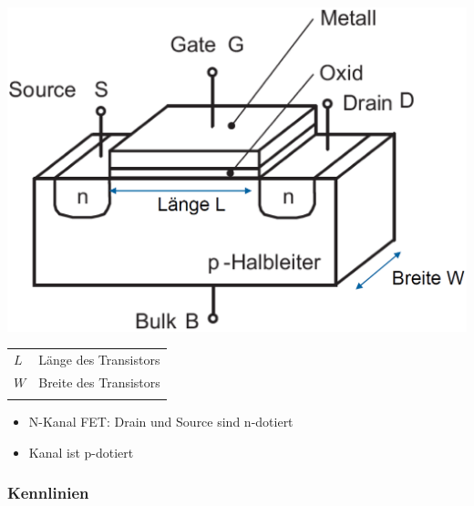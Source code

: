     \begin{minipage}[t]{0.35\columnwidth}
        \includegraphics[align=c, width=\columnwidth]{images/mos_fet_aufbau.png}
    \end{minipage}
    \hfill
    \begin{minipage}[c]{0.6\columnwidth}
        \begin{tabular}{l l}
            $L$ & Länge des Transistors  \\
            $W$ & Breite des Transistors \\
            \\
        \end{tabular}


        \begin{itemize}
            \item N-Kanal FET: Drain und Source sind n-dotiert
            \item Kanal ist p-dotiert
        \end{itemize}
    \end{minipage}


\subsubsection{Kennlinien}

